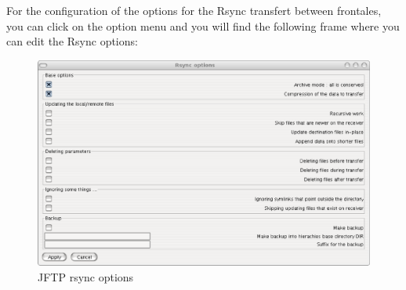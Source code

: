 For the configuration of the options for the Rsync transfert between \gfk
frontales, you can click on the option menu and you will find the following
frame where you can edit the Rsync options:

\begin{figure}[H]
	\centering
	\includegraphics[width=0.5\linewidth]{figures/GRUDU_jftp2.eps}
	\caption{JFTP rsync options}
	\label{fig:GRUDU_jftp2}
\end{figure}

